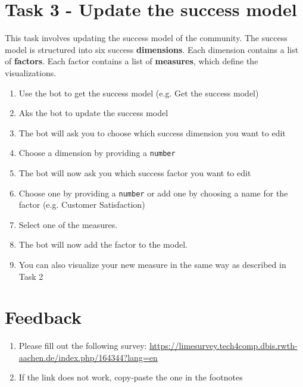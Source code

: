 \section*{Task 3 - Update the success model}
This task involves updating the success model of the community. The success model is structured into six success \textbf{dimensions}. Each dimension contains a list of \textbf{factors}. Each factor contains a list of \textbf{measures}, which define the visualizations.
\begin{enumerate}
    \item Use the bot to get the success model (e.g. Get the success model)
    \item Aks the bot to update the success model
    \item The bot will ask you to choose which success dimension you want to edit
    \item Choose a dimension by providing a \texttt{number}
    \item The bot will now ask you which success factor you want to edit
    \item Choose one by providing a \texttt{number} or add one by choosing a name for the factor (e.g. Customer Satisfaction)
    \item Select one of the measures. 
    \item The bot will now add the factor to the model.
    \item You can also visualize your new measure in the same way as described in Task 2
\end{enumerate}

\section*{Feedback}
  
\begin{enumerate}
  \item Please fill out the following survey: \url{https://limesurvey.tech4comp.dbis.rwth-aachen.de/index.php/164344?lang=en}
  \item If the link does not work, copy-paste  the one in the footnotes \footnotemark 
\end{enumerate}

